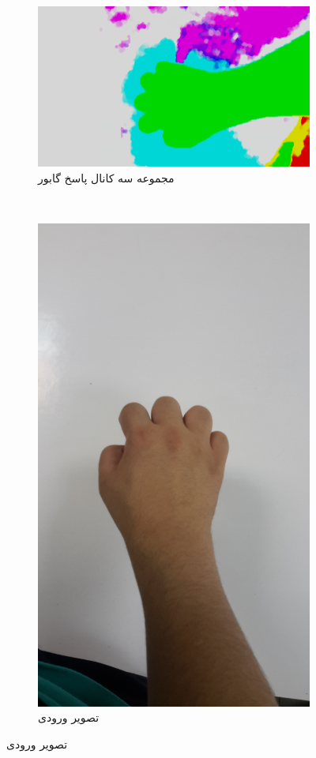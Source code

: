 \documentclass[11.5pt,a4paper]{article}
\begin{document}
\begin{figure}[h]
\begin{subfigure}{.4\textwidth}
		\includegraphics[scale=0.4]{Imgs/gabors4.png}
		\caption{مجموعه سه کانال پاسخ گابور}
	\end{subfigure}
\\
	\begin{subfigure}{.3\textwidth}
		\includegraphics[scale=0.05]{Imgs/origImgGab.jpg}
		\caption{ تصویر ورودی}
	\end{subfigure}
	

\end{figure}
\end{document}
